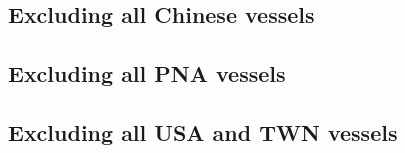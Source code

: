 \documentclass[9p,twocolumn,twoside,lineno]{pnas-new}
\begin{document}
\subsection{Excluding all Chinese vessels}



\clearpage
\subsection{Excluding all PNA vessels}



\clearpage

\subsection{Excluding all USA and TWN vessels}



\clearpage





 



\end{document}
